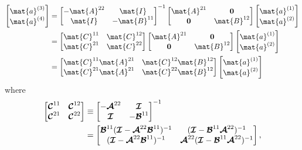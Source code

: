 \begin{align}
  \colvec{\mat{a}\three \\ \mat{a}\four} 
  &=
  \begin{bmatrix}
    -\mat{A}^{22} & \mat{I} \\
    \mat{I} & -\mat{B}^{11}
  \end{bmatrix}^{-1}
  \begin{bmatrix}
    \mat{A}^{21} & \0 \\
    \0 & \mat{B}^{12}
  \end{bmatrix} 
  \colvec{\mat{a}\one \\ \mat{a}\two} 
  \nonumber \\
  &=
  \begin{bmatrix}
    \mat{C}^{11} & \mat{C}^{12} \\
    \mat{C}^{21} & \mat{C}^{22}
  \end{bmatrix}
  \begin{bmatrix}
    \mat{A}^{21} & \0 \\
    \0 & \mat{B}^{12}
  \end{bmatrix} 
  \colvec{\mat{a}\one \\ \mat{a}\two} 
  \nonumber \\
  &=
  \begin{bmatrix}
    \mat{C}^{11} \mat{A}^{21} & \mat{C}^{12} \mat{B}^{12} \\
    \mat{C}^{21} \mat{A}^{21} & \mat{C}^{22} \mat{B}^{12}
  \end{bmatrix}
  \colvec{\mat{a}\one \\ \mat{a}\two} 
  \label{eq:b3b4temp}
\end{align}
where
\begin{align}
  \begin{bmatrix}
    \boldsymbol{\mathcal{C}}^{11} & \boldsymbol{\mathcal{C}}^{12} \\
    \boldsymbol{\mathcal{C}}^{21} & \boldsymbol{\mathcal{C}}^{22}
  \end{bmatrix}
  &\equiv
  \begin{bmatrix}
    -\boldsymbol{\mathcal{A}}^{22} & \boldsymbol{\mathcal{I}} \\
    \boldsymbol{\mathcal{I}} & -\boldsymbol{\mathcal{B}}^{11}
  \end{bmatrix}^{-1}
  \nonumber \\
  &=
  \begin{bmatrix}
    \boldsymbol{\mathcal{B}}^{11} (\boldsymbol{\mathcal{I}} - \boldsymbol{\mathcal{A}}^{22} \boldsymbol{\mathcal{B}}^{11})^{-1} & 
    (\boldsymbol{\mathcal{I}} - \boldsymbol{\mathcal{B}}^{11} \boldsymbol{\mathcal{A}}^{22})^{-1} \\
     (\boldsymbol{\mathcal{I}} - \boldsymbol{\mathcal{A}}^{22} \boldsymbol{\mathcal{B}}^{11})^{-1} & 
    \boldsymbol{\mathcal{A}}^{22} (\boldsymbol{\mathcal{I}} - \boldsymbol{\mathcal{B}}^{11} \boldsymbol{\mathcal{A}}^{22})^{-1}
  \end{bmatrix}, 
\end{align}
